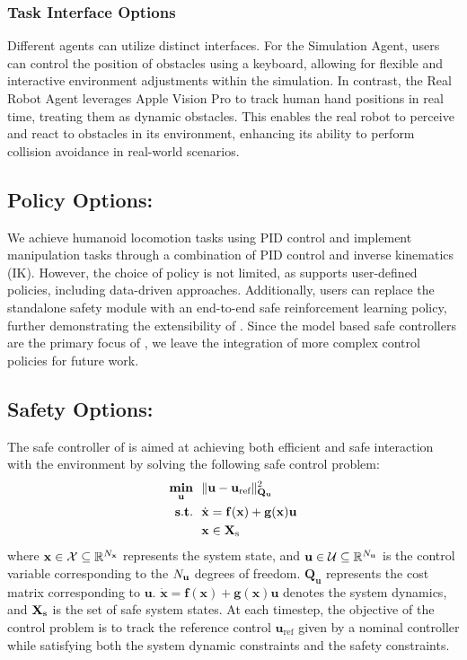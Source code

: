 \subsubsection{Task Interface Options}
Different agents can utilize distinct interfaces. For the Simulation Agent, users can control the position of obstacles using a keyboard, allowing for flexible and interactive environment adjustments within the simulation. In contrast, the Real Robot Agent leverages Apple Vision Pro to track human hand positions in real time, treating them as dynamic obstacles. This enables the real robot to perceive and react to obstacles in its environment, enhancing its ability to perform collision avoidance in real-world scenarios.

\subsection{Policy Options:}
We achieve humanoid locomotion tasks using PID control and implement manipulation tasks through a combination of PID control and inverse kinematics (IK). However, the choice of policy is not limited, as \spark supports user-defined policies, including data-driven approaches. Additionally, users can replace the standalone safety module with an end-to-end safe reinforcement learning policy, further demonstrating the extensibility of \spark. Since the model based safe controllers are the primary focus of \spark, we leave the integration of more complex control policies for future work.

\subsection{Safety Options:}

The safe controller of \spark is aimed at achieving both efficient and safe interaction with the environment by solving the following safe control problem:
\begin{align}\label{eq:safe_control_problem}
\mathop{\underset{\mathbf{u}}{\mathop{\mathbf{min}}}}~~ & \|\mathbf{u} - \mathbf{u}_{\text{ref}} \|^2_{\mathbf{Q}_\mathbf{u}}   \\ \nonumber
\mathop{\mathbf{s.t.}}~~ & \dot{\mathbf{x}} = \mathbf{f}(\mathbf{x}) + \mathbf{g}(\mathbf{x})\mathbf{u} \\ \nonumber
& \mathbf{x} \in \mathbf{X}_\mathrm{s}
\end{align}
where $\mathbf{x} \in \mathcal{X} \subseteq \mathbb{R}^{N_{\mathbf{x}}}$ represents the system state, and $\mathbf{u} \in \mathcal{U} \subseteq \mathbb{R}^{N_{\mathbf{u}}}$ is the control variable corresponding to the $N_{\mathbf{u}}$ degrees of freedom. $\mathbf{Q}_\mathbf{u}$ represents the cost matrix corresponding to $\mathbf{u}$. $\dot{\mathbf{x}} =\mathbf{f}(\mathbf{x}) + \mathbf{g}(\mathbf{x})\mathbf{u}$ denotes the system dynamics, and $\mathbf{X}_\mathrm{s}$ is the set of safe system states. At each timestep, the objective of the control problem is to track the reference control $\mathbf{u}_{\text{ref}}$ given by a nominal controller while satisfying both the system dynamic constraints and the safety constraints.  

